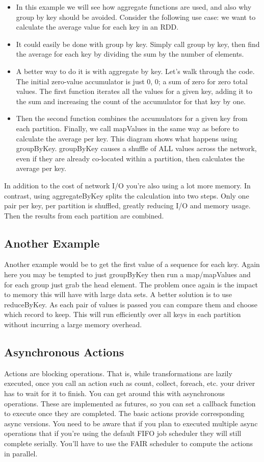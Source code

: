 \documentclass[a4paper,12pt]{article}
\begin{document}
\begin{itemize}
\item In this example we will see how aggregate functions are used, and also why group by key should be
avoided. Consider the following use case: we want to calculate the average value for each key in an RDD.
\item It could easily be done with group by key. Simply call group by key, then find the average for each key by
dividing the sum by the number of elements.
\item A better way to do it is with aggregate by key. Let's walk through the code. The initial zero-value
accumulator is just 0, 0; a sum of zero for zero total values. The first function iterates all the values for a
given key, adding it to the sum and increasing the count of the accumulator for that key by one.
\item Then the second function combines the accumulators for a given key from each partition. Finally, we call
mapValues in the same way as before to calculate the average per key.
This diagram shows what happens using groupByKey. groupByKey causes a shuffle of ALL values across
the network, even if they are already co-located within a partition, then calculates the average per key.
\end{itemize}
In addition to the cost of network I/O you’re also using a lot more memory.
In contrast, using aggregateByKey splits the calculation into two steps. Only one pair per key, per
partition is shuffled, greatly reducing I/O and memory usage. Then the results from each partition are
combined.
\subsection*{Another Example}
Another example would be to get the first value of a sequence for each key. Again here you may be
tempted to just groupByKey then run a map/mapValues and for each group just grab the head element.
The problem once again is the impact to memory this will have with large data sets. A better solution is
to use reduceByKey. As each pair of values is passed you can compare them and choose which record to
keep. This will run efficiently over all keys in each partition without incurring a large memory overhead.
\subsection*{Asynchronous Actions}
Actions are blocking operations. That is, while transformations are lazily executed, once you call an
action such as count, collect, foreach, etc. your driver has to wait for it to finish. You can get around this
with asynchronous operations. These are implemented as futures, so you can set a callback function to
execute once they are completed. The basic actions provide corresponding async versions. You need to
be aware that if you plan to executed multiple async operations that if you’re using the default FIFO job
scheduler they will still complete serially. You’ll have to use the FAIR scheduler to compute the actions in
parallel.
\end{document}

